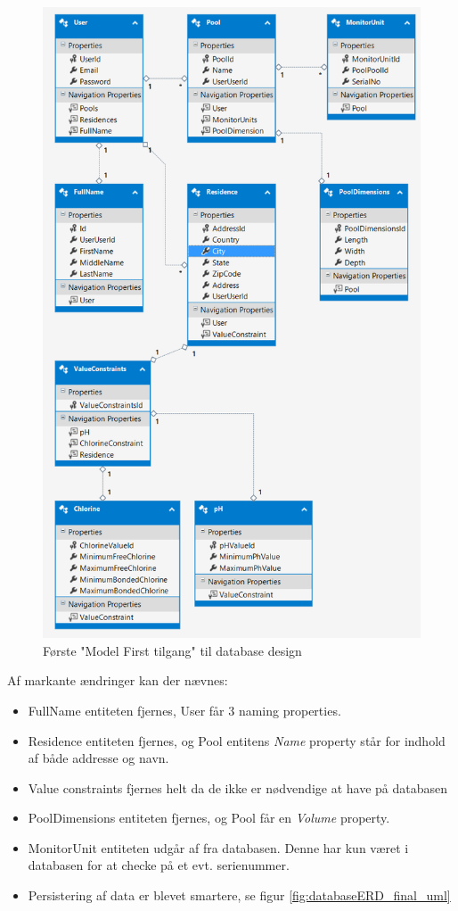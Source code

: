 \begin{figure}[H]
\centering
\includegraphics[width=0.8\linewidth]{figs/design/databaseERD}
\caption{Første "Model First tilgang" til database design}
\label{fig:databaseERD_firstattempt_uml}
\end{figure}

Af markante ændringer kan der nævnes:

\begin{itemize}
	\item FullName entiteten fjernes, User får 3 naming properties.
	\item Residence entiteten fjernes, og Pool entitens \textit{Name} property står for indhold af både addresse og navn.
	\item Value constraints fjernes helt da de ikke er nødvendige at have på databasen
	\item PoolDimensions entiteten fjernes, og Pool får en \textit{Volume} property.
	\item MonitorUnit entiteten udgår af fra databasen. Denne har kun været i databasen for at checke på et evt. serienummer.
	\item Persistering af data er blevet smartere, se figur \ref{fig:databaseERD_final_uml}
\end{itemize}


